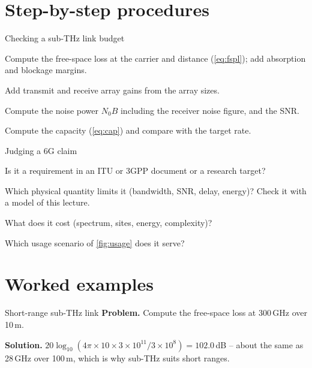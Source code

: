 \documentclass[11pt,a4paper]{article}
\begin{document}
\section{Step-by-step procedures}

\begin{procedurebox}{Checking a sub-THz link budget}\label{proc:budget}
\begin{steps}
  \item Compute the free-space loss at the carrier and distance (\cref{eq:fspl}); add absorption and blockage margins.
  \item Add transmit and receive array gains from the array sizes.
  \item Compute the noise power $N_0B$ including the receiver noise figure, and the SNR.
  \item Compute the capacity (\cref{eq:cap}) and compare with the target rate.
\end{steps}
\end{procedurebox}

\begin{procedurebox}{Judging a 6G claim}\label{proc:claim}
\begin{steps}
  \item Is it a requirement in an ITU or 3GPP document or a research target?
  \item Which physical quantity limits it (bandwidth, SNR, delay, energy)? Check it with a model of this lecture.
  \item What does it cost (spectrum, sites, energy, complexity)?
  \item Which usage scenario of \cref{fig:usage} does it serve?
\end{steps}
\end{procedurebox}

\section{Worked examples}

\begin{examplebox}{Short-range sub-THz link}\label{ex:thz}
\textbf{Problem.} Compute the free-space loss at 300\,GHz over 10\,m.

\textbf{Solution.} $20\log_{10}(4\pi\times10\times3\times10^{11}/3\times10^{8}) = 102.0$\,dB -- about the same as 28\,GHz over 100\,m, which is why sub-THz suits short
ranges.
\end{examplebox}
\end{document}
